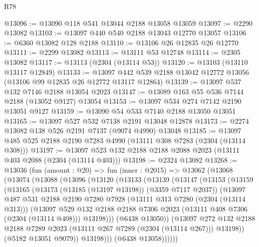 \begin{lexlean}{R78}
\begin{coremodule}
@13096 := @13090 @118 @541 @13044 @2188 @13058 @13059
@13097 := @2290 @13082
@13103 := @13097 @440 @540 @2188 @13043 @12770 @13057
@13106 := @6360 @13082 @128 @2188
@13110 := @13106 @26 @12835 @26 @12770
@13111 := @2299 @13082
@13113 := @13111 @53 @12748
@13114 := @2305 @13082
@13117 := @13113 (@2304 (@13114 @53))
@13120 := @13103 (@13110 @13117 @12849)
@13133 := @13097 @442 @539 @2188 @13042 @12772 @13056 (@13106 @99 @12835 @26 @12772 @13117 @12864)
@13139 := @13097 @537 @132 @7146 @2188 @13054 @2023
@13147 := @13089 @163 @55 @536 @7144 @2188 (@13052 @9127) @13054
@13153 := @13097 @534 @274 @7142 @2190 @13051 @9127
@13159 := @13090 @54 @533 @7140 @2188 @13050 @13051
@13165 := @13097 @527 @532 @7138 @2191 @13048 @12878
@13173 := @2274 @13082 @138 @526 @2191 @7137 (@9074 @4990) @13048
@13185 := @13097 @485 @525 @2188 @2190 @7283 @4990 (@13111 @308 @7283 (@2304 (@13114 @308)))
@13197 := @13097 @523 @132 @2188 @2188 @2088 @2023 (@13111 @403 @2088 (@2304 (@13114 @403)))
@13198 := @2324 @13082
@13268 := @13036
    (fun (amount : @20) =>
    fun (inner : @2015) =>
    @13062
      (@13068
        (@13074
          (@13088
            (@13096
              (@13120
                (@13133
                  (@13139
                    (@13147
                      (@13153
                        (@13159
                          (@13165
                            (@13173 (@13185 (@13197 @13198)) (@3359 @7117 @2037))
                            (@13097
                              @487
                              @531
                              @2188
                              @2190
                              @7280
                              @7928
                              (@13111 @313 @7280 (@2304 (@13114 @313)))
                              (@13097
                                @529
                                @132
                                @2188
                                @2188
                                @7306
                                @2023
                                (@13111 @408 @7306 (@2304 (@13114 @408)))
                                @13198)))
                          (@6438 @13050))
                        (@13097
                          @272
                          @132
                          @2188
                          @2188
                          @7289
                          @2023
                          (@13111 @267 @7289 (@2304 (@13114 @267)))
                          @13198))
                      (@5182 @13051 @9079))
                    @13198)))
              (@6438 @13058))))))

\end{coremodule}
\end{lexlean}
